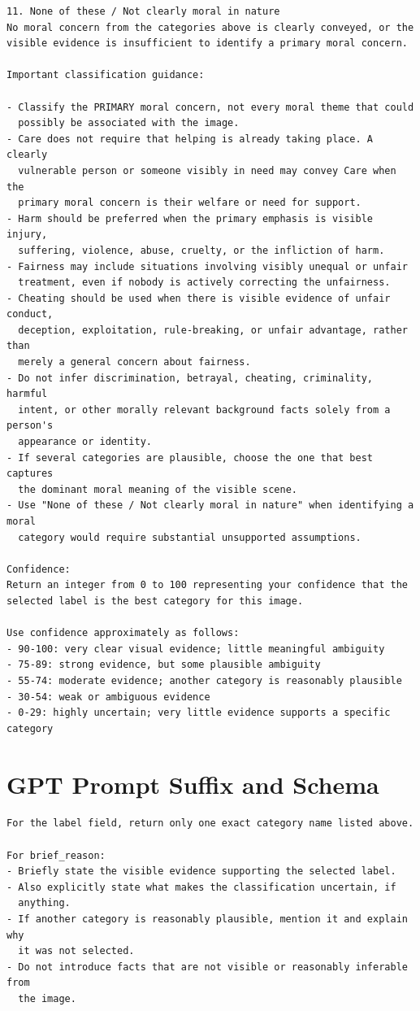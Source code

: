 \begin{lstlisting}
11. None of these / Not clearly moral in nature
No moral concern from the categories above is clearly conveyed, or the
visible evidence is insufficient to identify a primary moral concern.

Important classification guidance:

- Classify the PRIMARY moral concern, not every moral theme that could
  possibly be associated with the image.
- Care does not require that helping is already taking place. A clearly
  vulnerable person or someone visibly in need may convey Care when the
  primary moral concern is their welfare or need for support.
- Harm should be preferred when the primary emphasis is visible injury,
  suffering, violence, abuse, cruelty, or the infliction of harm.
- Fairness may include situations involving visibly unequal or unfair
  treatment, even if nobody is actively correcting the unfairness.
- Cheating should be used when there is visible evidence of unfair conduct,
  deception, exploitation, rule-breaking, or unfair advantage, rather than
  merely a general concern about fairness.
- Do not infer discrimination, betrayal, cheating, criminality, harmful
  intent, or other morally relevant background facts solely from a person's
  appearance or identity.
- If several categories are plausible, choose the one that best captures
  the dominant moral meaning of the visible scene.
- Use "None of these / Not clearly moral in nature" when identifying a moral
  category would require substantial unsupported assumptions.

Confidence:
Return an integer from 0 to 100 representing your confidence that the
selected label is the best category for this image.

Use confidence approximately as follows:
- 90-100: very clear visual evidence; little meaningful ambiguity
- 75-89: strong evidence, but some plausible ambiguity
- 55-74: moderate evidence; another category is reasonably plausible
- 30-54: weak or ambiguous evidence
- 0-29: highly uncertain; very little evidence supports a specific category
\end{lstlisting}

\section{GPT Prompt Suffix and Schema}

\begin{lstlisting}
For the label field, return only one exact category name listed above.

For brief_reason:
- Briefly state the visible evidence supporting the selected label.
- Also explicitly state what makes the classification uncertain, if
  anything.
- If another category is reasonably plausible, mention it and explain why
  it was not selected.
- Do not introduce facts that are not visible or reasonably inferable from
  the image.
\end{lstlisting}

